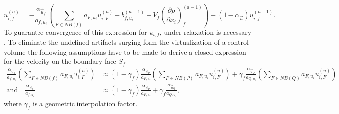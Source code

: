   \begin{equation}
    \label{eq:virtualu}
    u_{i,f}^{(n)} 
    = 
    - \frac{\alpha_{\vec{u}_f}}{a_{f,u_i}} \left(\sum_{F \in NB(f)} a_{F,u_i} u_{i,F}^{(n)} 
    +                                     b_{f,u_i}^{(n-1)} 
    -                                     V_f\left(\frac{\partial p}{\partial x_i}\right)_f^{(n-1)}  \right)
    + \left(1 - \alpha_{\vec{u}}\right) u_{i,f}^{(n-1)}.
  \end{equation}
  To guarantee convergence of this expression for \(u_{i,f}\), under-relaxation is necessary \cite{majumdar88}. To eliminate the undefined artifacts surging form the virtualization of a control volume the following assumptions have to be made to derive a closed expression for the velocity on the boundary face \(S_f\)
  \begin{subequations}
    \label{eq:approxpwim}
  \begin{align}
    \frac{\alpha_{\vec{u}_f}}{a_{f,u_i}} \left(\sum_{F \in NB(f)} a_{F,u_i} u_{i,F}^{(n)} \right)
    &\approx
    \left(1-\gamma_f\right) \frac{\alpha_{\vec{u}_P}}{a_{P,u_i}} \left(\sum_{F \in NB(P)} a_{F,u_i} u_{i,F}^{(n)} \right)
    +
    \gamma_f \frac{\alpha_{\vec{u}_Q}}{a_{Q,u_i}} \left(\sum_{F \in NB(Q)} a_{F,u_i} u_{i,F}^{(n)} \right) \\[1em]
    \text{and} \quad
    \frac{\alpha_{\vec{u}_f}}{a_{f,u_i}} 
    &\approx
    \left(1-\gamma_f\right) \frac{\alpha_{\vec{u}_P}}{a_{P,u_i}} 
    +
    \gamma_f \frac{\alpha_{\vec{u}_Q}}{a_{Q,u_i}},
  \end{align}
  \end{subequations}
  where \(\gamma_f\) is a geometric interpolation factor. 

